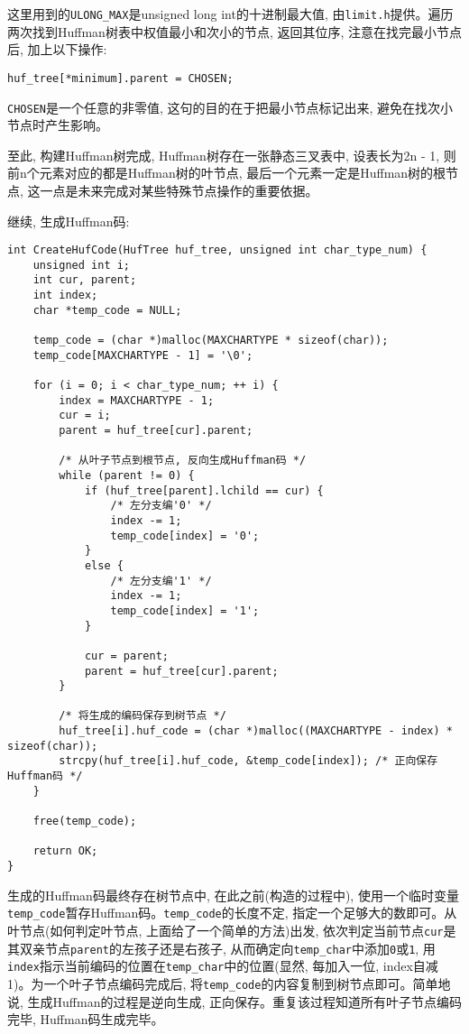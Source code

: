 \documentclass[a4paper]{ctexart}
\begin{document}
这里用到的\texttt{ULONG\_MAX}是unsigned long int的十进制最大值, 由\texttt{limit.h}提供。遍历两次找到Huffman树表中权值最小和次小的节点, 返回其位序, 注意在找完最小节点后, 加上以下操作:

{\setmainfont{Courier New Bold}              
\begin{lstlisting}
huf_tree[*minimum].parent = CHOSEN;
\end{lstlisting}}

\texttt{CHOSEN}是一个任意的非零值, 这句的目的在于把最小节点标记出来, 避免在找次小节点时产生影响。

至此, 构建Huffman树完成, Huffman树存在一张静态三叉表中, 设表长为2n - 1, 则前n个元素对应的都是Huffman树的叶节点, 最后一个元素一定是Huffman树的根节点, 这一点是未来完成对某些特殊节点操作的重要依据。

继续, 生成Huffman码:

{\setmainfont{Courier New Bold}              
\begin{lstlisting}
int CreateHufCode(HufTree huf_tree, unsigned int char_type_num) {
    unsigned int i;
    int cur, parent;
    int index;
    char *temp_code = NULL;

    temp_code = (char *)malloc(MAXCHARTYPE * sizeof(char));
    temp_code[MAXCHARTYPE - 1] = '\0';

    for (i = 0; i < char_type_num; ++ i) {
        index = MAXCHARTYPE - 1;
        cur = i;
        parent = huf_tree[cur].parent;

        /* 从叶子节点到根节点, 反向生成Huffman码 */
        while (parent != 0) {
            if (huf_tree[parent].lchild == cur) {
                /* 左分支编'0' */
                index -= 1;
                temp_code[index] = '0';
            }
            else {
                /* 左分支编'1' */
                index -= 1;
                temp_code[index] = '1';
            }

            cur = parent;
            parent = huf_tree[cur].parent;
        }

        /* 将生成的编码保存到树节点 */
        huf_tree[i].huf_code = (char *)malloc((MAXCHARTYPE - index) * sizeof(char));
        strcpy(huf_tree[i].huf_code, &temp_code[index]); /* 正向保存Huffman码 */
    }

    free(temp_code);

    return OK;
}
\end{lstlisting}}

生成的Huffman码最终存在树节点中, 在此之前(构造的过程中), 使用一个临时变量\texttt{temp\_code}暂存Huffman码。\texttt{temp\_code}的长度不定, 指定一个足够大的数即可。从叶节点(如何判定叶节点,
上面给了一个简单的方法)出发, 依次判定当前节点\texttt{cur}是其双亲节点\texttt{parent}的左孩子还是右孩子, 从而确定向\texttt{temp\_char}中添加\texttt{0}或\texttt{1}, 用\texttt{index}指示当前编码的位置在\texttt{temp\_char}中的位置(显然, 每加入一位, index自减1)。为一个叶子节点编码完成后, 将\texttt{temp\_code}的内容复制到树节点即可。简单地说, 生成Huffman的过程是逆向生成, 正向保存。重复该过程知道所有叶子节点编码完毕, Huffman码生成完毕。
\end{document}
